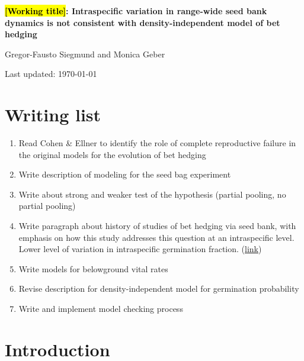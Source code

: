 \documentclass[12pt, oneside, titlepage]{article}   	%
\begin{document}
\begin{titlepage}
   \begin{center}
       \vspace*{1cm}
 
       \textbf{\hl{[Working title]}: Intraspecific variation in range-wide seed bank dynamics is not consistent with density-independent model of bet hedging}
 
       \vspace{1.5cm}
 
       Gregor-Fausto Siegmund and Monica Geber
 
   	Last updated: \today
	
	\section*{Writing list}
	
	\begin{enumerate}
	
	\item Read Cohen \& Ellner to identify the role of complete reproductive failure in the original models for the evolution of bet hedging
	\item Write description of modeling for the seed bag experiment
	\item Write about strong and weaker test of the hypothesis (partial pooling, no partial pooling) 
	\item Write paragraph about history of studies of bet hedging via seed bank, with emphasis on how this study addresses this question at an intraspecific level. Lower level of variation in intraspecific germination fraction. (\hyperlink{bet-hedging-history}{link})
	\item Write models for belowground vital rates
	\item Revise description for density-independent model for germination probability
	\item Write and implement model checking process
	
	\end{enumerate}
 
   \end{center}
\end{titlepage}
%

\section*{Introduction}
\end{document}
